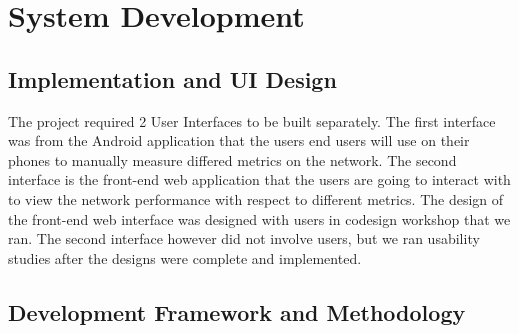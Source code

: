 \section{System Development}\label{sec:system-development}
\subsection{Implementation and UI Design}\label{subsec:implementation-and-ui-design}
The project required 2 User Interfaces to be built separately.
The first interface was from the Android application that the users end users will use on their phones to manually measure differed metrics on the network.
The second interface is the front-end web application that the users are going to interact with to view the network performance with respect to different metrics.
The design of the front-end web interface was designed with users in codesign workshop that we ran.
The second interface however did not involve users, but we ran usability studies after the designs were complete and implemented.
\subsection{Development Framework and Methodology}\label{subsec:development-framework-and-methodology}
